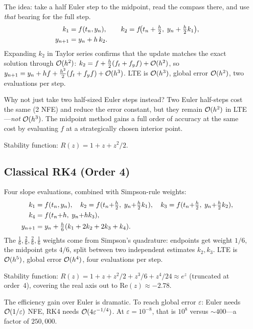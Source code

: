\documentclass[11pt]{article}
\begin{document}
The idea: take a half Euler step to the midpoint, read the
compass there, and use \emph{that} bearing for the full step.
\begin{align}
k_1 &= f(t_n,y_n),\qquad
k_2 = f\!\bigl(t_n+\tfrac{h}{2},\;y_n+\tfrac{h}{2}k_1\bigr),
\label{eq:midpoint-stages}\\
y_{n+1} &= y_n + h\,k_2. \label{eq:midpoint-update}
\end{align}
Expanding $k_2$ in Taylor series confirms that the update matches
the exact solution through $\mathcal{O}(h^2)$:
$k_2 = f + \frac{h}{2}(f_t+f_yf)+\mathcal{O}(h^2)$, so
$y_{n+1} = y_n + hf + \frac{h^2}{2}(f_t+f_yf)+\mathcal{O}(h^3)$.
LTE is $\mathcal{O}(h^3)$, global error $\mathcal{O}(h^2)$, two evaluations per step.

Why not just take two half-sized Euler steps instead?  Two
Euler half-steps cost the same (2 NFE) and reduce the error
constant, but they remain $\mathcal{O}(h^2)$ in LTE---\emph{not}
$\mathcal{O}(h^3)$.  The midpoint method gains a full order of accuracy
at the same cost by evaluating $f$ at a strategically chosen
interior point.

Stability function: $R(z)=1+z+z^2/2$.

\subsection{Classical RK4 (Order 4)}
\label{sec:rk4}

Four slope evaluations, combined with Simpson-rule weights:
\begin{align}
k_1 &= f(t_n,y_n),\quad
k_2 = f(t_n{+}\tfrac{h}{2},\;y_n{+}\tfrac{h}{2}k_1),\quad
k_3 = f(t_n{+}\tfrac{h}{2},\;y_n{+}\tfrac{h}{2}k_2),\nonumber\\
k_4 &= f(t_n{+}h,\;y_n{+}hk_3),\label{eq:rk4-stages}\\
y_{n+1} &= y_n + \tfrac{h}{6}(k_1+2k_2+2k_3+k_4).
\label{eq:rk4-update}
\end{align}
The $\frac{1}{6},\frac{2}{6},\frac{2}{6},\frac{1}{6}$ weights
come from Simpson's quadrature: endpoints get weight $1/6$,
the midpoint gets $4/6$, split between two independent estimates
$k_2,k_3$.  LTE is $\mathcal{O}(h^5)$, global error $\mathcal{O}(h^4)$, four
evaluations per step.

Stability function:
$R(z)=1+z+z^2/2+z^3/6+z^4/24\approx e^z$ (truncated at order~4),
covering the real axis out to $\text{Re}(z)\approx-2.78$.

The efficiency gain over Euler is dramatic.  To reach global error
$\varepsilon$: Euler needs $\mathcal{O}(1/\varepsilon)$ NFE, RK4 needs
$\mathcal{O}(4\varepsilon^{-1/4})$.  At $\varepsilon=10^{-8}$, that is
$10^8$ versus ${\sim}400$---a factor of $250{,}000$.
\end{document}
